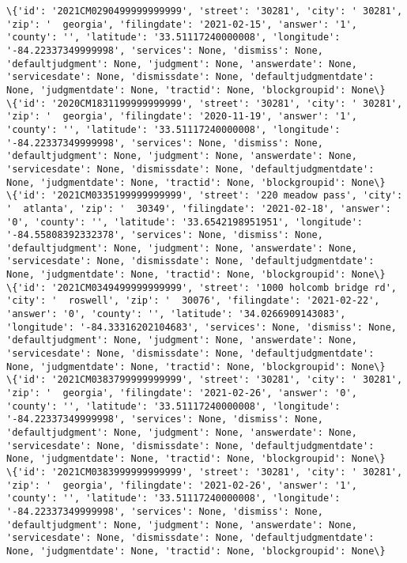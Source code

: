 \documentclass[11pt]{article}
\begin{document}
\begin{Verbatim}[commandchars=\\\{\}]
\{'id': '2021CM0290499999999999', 'street': '30281', 'city': ' 30281', 'zip': '  georgia', 'filingdate': '2021-02-15', 'answer': '1', 'county': '', 'latitude': '33.51117240000008', 'longitude': '-84.22337349999998', 'services': None, 'dismiss': None, 'defaultjudgment': None, 'judgment': None, 'answerdate': None, 'servicesdate': None, 'dismissdate': None, 'defaultjudgmentdate': None, 'judgmentdate': None, 'tractid': None, 'blockgroupid': None\}
\{'id': '2020CM1831199999999999', 'street': '30281', 'city': ' 30281', 'zip': '  georgia', 'filingdate': '2020-11-19', 'answer': '1', 'county': '', 'latitude': '33.51117240000008', 'longitude': '-84.22337349999998', 'services': None, 'dismiss': None, 'defaultjudgment': None, 'judgment': None, 'answerdate': None, 'servicesdate': None, 'dismissdate': None, 'defaultjudgmentdate': None, 'judgmentdate': None, 'tractid': None, 'blockgroupid': None\}
\{'id': '2021CM0335199999999999', 'street': '220 meadow pass', 'city': '  atlanta', 'zip': '  30349', 'filingdate': '2021-02-18', 'answer': '0', 'county': '', 'latitude': '33.6542198951951', 'longitude': '-84.55808392332378', 'services': None, 'dismiss': None, 'defaultjudgment': None, 'judgment': None, 'answerdate': None, 'servicesdate': None, 'dismissdate': None, 'defaultjudgmentdate': None, 'judgmentdate': None, 'tractid': None, 'blockgroupid': None\}
\{'id': '2021CM0349499999999999', 'street': '1000 holcomb bridge rd', 'city': '  roswell', 'zip': '  30076', 'filingdate': '2021-02-22', 'answer': '0', 'county': '', 'latitude': '34.0266909143083', 'longitude': '-84.33316202104683', 'services': None, 'dismiss': None, 'defaultjudgment': None, 'judgment': None, 'answerdate': None, 'servicesdate': None, 'dismissdate': None, 'defaultjudgmentdate': None, 'judgmentdate': None, 'tractid': None, 'blockgroupid': None\}
\{'id': '2021CM0383799999999999', 'street': '30281', 'city': ' 30281', 'zip': '  georgia', 'filingdate': '2021-02-26', 'answer': '0', 'county': '', 'latitude': '33.51117240000008', 'longitude': '-84.22337349999998', 'services': None, 'dismiss': None, 'defaultjudgment': None, 'judgment': None, 'answerdate': None, 'servicesdate': None, 'dismissdate': None, 'defaultjudgmentdate': None, 'judgmentdate': None, 'tractid': None, 'blockgroupid': None\}
\{'id': '2021CM0383999999999999', 'street': '30281', 'city': ' 30281', 'zip': '  georgia', 'filingdate': '2021-02-26', 'answer': '1', 'county': '', 'latitude': '33.51117240000008', 'longitude': '-84.22337349999998', 'services': None, 'dismiss': None, 'defaultjudgment': None, 'judgment': None, 'answerdate': None, 'servicesdate': None, 'dismissdate': None, 'defaultjudgmentdate': None, 'judgmentdate': None, 'tractid': None, 'blockgroupid': None\}

\end{Verbatim}
\end{document}
